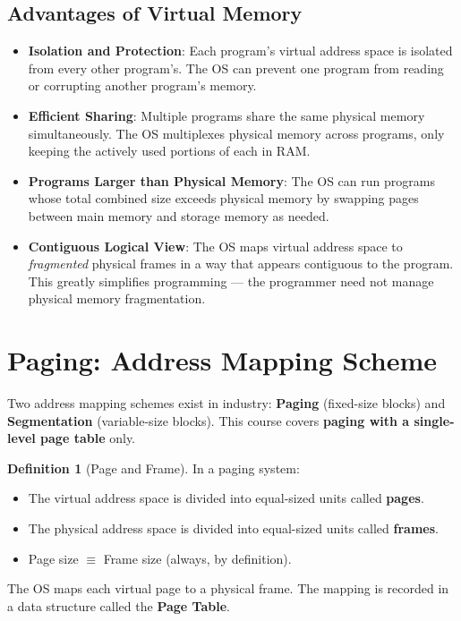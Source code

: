 \documentclass[11pt, a4paper, notitlepage]{report}
\theoremstyle{definition}
\newtheorem{definition}[theorem]{Definition}
\theoremstyle{remark}
\theoremstyle{definition}
\begin{document}
\subsection{Advantages of Virtual Memory}
\label{sec:vmm-advantages}

\begin{itemize}
  \item \textbf{Isolation and Protection}: Each program's virtual address space is isolated from every other program's. The OS can prevent one program from reading or corrupting another program's memory.
  \item \textbf{Efficient Sharing}: Multiple programs share the same physical memory simultaneously. The OS multiplexes physical memory across programs, only keeping the actively used portions of each in RAM.
  \item \textbf{Programs Larger than Physical Memory}: The OS can run programs whose total combined size exceeds physical memory by swapping pages between main memory and storage memory as needed.
  \item \textbf{Contiguous Logical View}: The OS maps virtual address space to \emph{fragmented} physical frames in a way that appears contiguous to the program. This greatly simplifies programming — the programmer need not manage physical memory fragmentation.
\end{itemize}

\section{Paging: Address Mapping Scheme}
\label{sec:paging}

Two address mapping schemes exist in industry: \textbf{Paging} (fixed-size blocks) and \textbf{Segmentation} (variable-size blocks). This course covers \textbf{paging with a single-level page table} only.

\begin{definition}[Page and Frame]
  \label{def:page-frame}
  In a paging system:
  \begin{itemize}
    \item The virtual address space is divided into equal-sized units called \textbf{pages}.
    \item The physical address space is divided into equal-sized units called \textbf{frames}.
    \item Page size $\equiv$ Frame size (always, by definition).
  \end{itemize}
  The OS maps each virtual page to a physical frame. The mapping is recorded in a data structure called the \textbf{Page Table}.
\end{definition}
\end{document}
